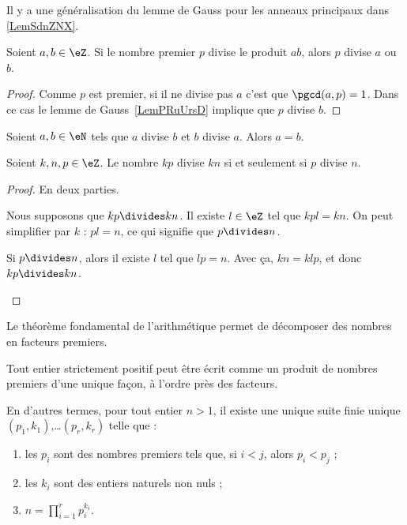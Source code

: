 Il y a une généralisation du lemme de Gauss pour les anneaux principaux dans \ref{LemSdnZNX}.
\begin{lemma}       \label{LemAXINooOeuMJZ}
	Soient \( a,b\in \eZ\). Si le nombre premier \( p\) divise le produit \( ab\), alors \( p\) divise \( a\) ou \( b\).
\end{lemma}

\begin{proof}
	Comme \( p\) est premier, si il ne divise pas \( a\) c'est que \( \pgcd(a,p)=1\). Dans ce cas le lemme de Gauss~\ref{LemPRuUrsD} implique que \( p\) divise \( b\).
\end{proof}

\begin{lemma}		\label{LEMooSRFMooHgEMwj}
	Soient \( a,b\in \eN\) tels que \( a\) divise \( b\) et \( b\) divise \( a\). Alors \( a=b\).
\end{lemma}

\begin{lemma}	\label{LEMooFVSJooRysGAm}
	Soient \( k,n,p\in \eZ\). Le nombre \( kp\) divise \( kn\) si et seulement si \( p\) divise \( n\).
\end{lemma}

\begin{proof}
	En deux parties.
	\begin{subproof}
		\spitem[\( \Rightarrow\)]
		Nous supposons que \( kp\divides kn\). Il existe \( l\in \eZ\) tel que \( kpl=kn\). On peut simplifier par \( k\) : \( pl=n\), ce qui signifie que \( p\divides n\).

		\spitem[\( \Leftarrow\)]
		Si \( p\divides n\), alors il existe \( l\) tel que \( lp=n\). Avec ça, \( kn=klp\), et donc \( kp\divides kn\).
	\end{subproof}
\end{proof}

Le théorème fondamental de l'arithmétique permet de décomposer des nombres en facteurs premiers.

\begin{theorem}        \label{ThoAJFJooAveRvY}
	Tout entier strictement positif peut être écrit comme un produit de nombres premiers d'une unique façon, à l'ordre près des facteurs.

	En d'autres termes, pour tout entier \( n>1\), il existe une unique suite finie unique \( (p_1, k_1)\),\ldots \( (p_r, k_r)\) telle que :
	\begin{enumerate}
		\item
		      les \( p_i\) sont des nombres premiers tels que, si \( i < j\), alors \( p_i < p_j\) ;
		\item
		      les \( k_i\) sont des entiers naturels non nuls ;
		\item
		      \( n=\prod_{i=1}^rp_i^{k_i}\).
	\end{enumerate}
\end{theorem}


